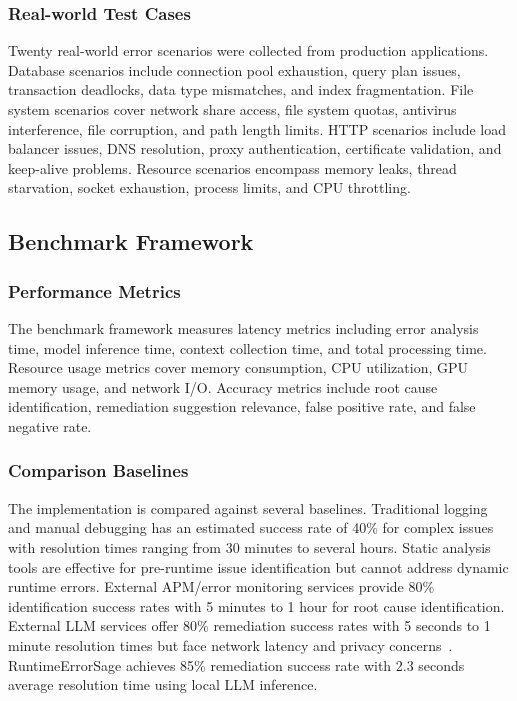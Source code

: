 \subsubsection{Real-world Test Cases}
Twenty real-world error scenarios were collected from production applications. Database scenarios include connection pool exhaustion, query plan issues, transaction deadlocks, data type mismatches, and index fragmentation. File system scenarios cover network share access, file system quotas, antivirus interference, file corruption, and path length limits. HTTP scenarios include load balancer issues, DNS resolution, proxy authentication, certificate validation, and keep-alive problems. Resource scenarios encompass memory leaks, thread starvation, socket exhaustion, process limits, and CPU throttling.

\subsection{Benchmark Framework}

\subsubsection{Performance Metrics}
The benchmark framework measures latency metrics including error analysis time, model inference time, context collection time, and total processing time. Resource usage metrics cover memory consumption, CPU utilization, GPU memory usage, and network I/O. Accuracy metrics include root cause identification, remediation suggestion relevance, false positive rate, and false negative rate.

\subsubsection{Comparison Baselines}
The implementation is compared against several baselines. Traditional logging and manual debugging has an estimated success rate of 40\% for complex issues with resolution times ranging from 30 minutes to several hours. Static analysis tools are effective for pre-runtime issue identification but cannot address dynamic runtime errors. External APM/error monitoring services provide 80\% identification success rates with 5 minutes to 1 hour for root cause identification. External LLM services offer 80\% remediation success rates with 5 seconds to 1 minute resolution times but face network latency and privacy concerns~\cite{cloud_llm_latency_2022}. RuntimeErrorSage achieves 85\% remediation success rate with 2.3 seconds average resolution time using local LLM inference.

